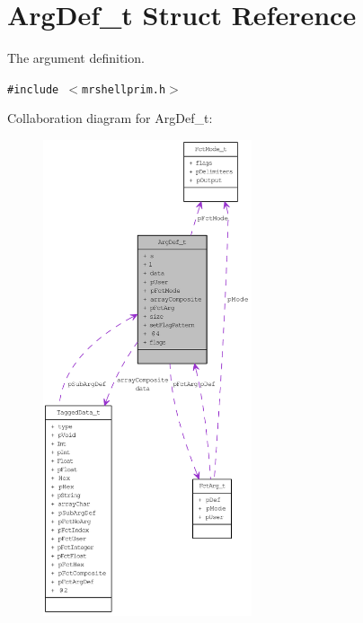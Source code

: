 \hypertarget{structArgDef__t}{
\section{Arg\-Def\_\-t Struct Reference}
\label{structArgDef__t}
}
The argument definition.  


{\tt \#include $<$mrshellprim.h$>$}

Collaboration diagram for Arg\-Def\_\-t:\begin{figure}[H]
\begin{center}
\leavevmode
\includegraphics[width=174pt]{structArgDef__t__coll__graph}
\end{center}
\end{figure}
